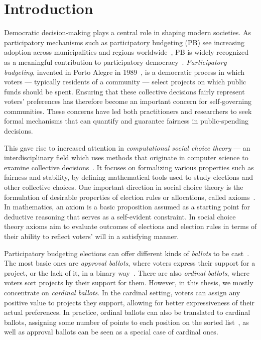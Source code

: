 \chapter*{Introduction}
Democratic decision‐making plays a central role in shaping modern societies. As participatory mechanisms such as participatory budgeting (PB) see increasing adoption across municipalities and regions worldwide~\cite{RussonGilman2012}, PB is widely recognized as a meaningful contribution to participatory democracy~\cite{PBCannabes}. \emph{Participatory budgeting}, invented in Porto Alegre in 1989~\cite{ParticipatoryBudgeting}, is a democratic process in which voters --- typically residents of a community --- select projects on which public funds should be spent.  Ensuring that these collective decisions fairly represent voters’ preferences has therefore become an important concern for self‐governing communities. These concerns have led both practitioners and researchers to seek formal mechanisms that can quantify and guarantee fairness in public‐spending decisions.

This gave rise to increased attention in \emph{computational social choice theory} --- an interdisciplinary field which uses methods that originate in computer science to examine collective decisions~\cite{AShortIntroductionToSocialChoice}. It focuses on formalizing various properties such as fairness and stability, by defining mathematical tools used to study elections and other collective choices.  One important direction in social choice theory is the formulation of desirable properties of election rules or allocations, called axioms~\cite{Brandt2016}. In mathematics, an axiom is a basic proposition assumed as a starting point for deductive reasoning that serves as a self-evident constraint. In social choice theory axioms aim to evaluate outcomes of elections and election rules in terms of their ability to reflect voters' will in a satisfying manner. 

Participatory budgeting elections can offer different kinds of \emph{ballots} to be cast~\cite{PBElicitation}. The most basic ones are \emph{approval ballots}, where voters express their support for a project, or the lack of it, in a binary way~\cite{Talmon_Faliszewski_2019}. There are also \emph{ordinal ballots}, where voters sort projects by their support for them. However, in this thesis, we mostly concentrate on \emph{cardinal ballots}. In the cardinal setting, voters can assign any positive value to projects they support, allowing for better expressiveness of their actual preferences. In practice, ordinal ballots can also be translated to cardinal ballots, assigning some number of points to each position on the sorted list~\cite{NSW2019}, as well as approval ballots can be seen as a special case of cardinal ones.

